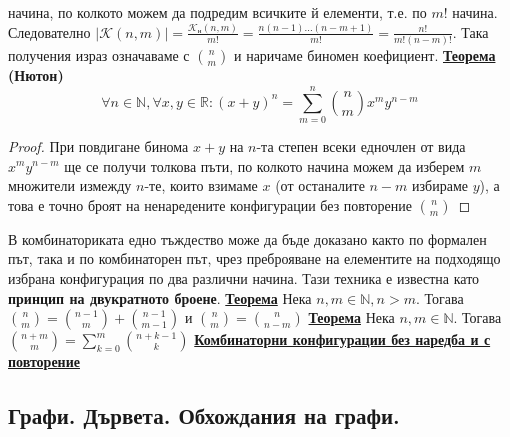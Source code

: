 \documentclass{article}
\begin{document}
начина, по колкото можем да подредим всичките й елементи, т.е. по $m!$ начина. Следователно $|\mathcal{K}(n, m)| = \frac{\mathcal{K_{\text{н}}}
(n, m)}{m!} = \frac{n(n - 1) ... (n - m + 1)}{m!} = \frac{n!}{m!(n - m)!}$. Така получения израз означаваме с $\binom{n}{m}$ и
наричаме биномен коефициент. \newline\newline
\textbf{\underline{Теорема} (Нютон)}
$$\forall n \in \mathbb{N}, \forall x, y \in \mathbb{R} : (x + y)^n = \sum_{m = 0}^{n}\binom{n}{m}x^my^{n-m}$$
\begin{proof}
При повдигане бинома $x + y$ на $n$-та степен всеки едночлен от вида $x^my^{n - m}$ ще се получи толкова пъти, по колкото начина
можем да изберем $m$ множители измежду $n$-те, които взимаме $x$ (от останалите $n - m$ избираме $y$), а това е точно броят на
ненаредените конфигурации без повторение $\binom{n}{m}$
\end{proof}
В комбинаториката едно тъждество може да бъде доказано както по формален път, така и по комбинаторен път, чрез преброяване на
елементите на подходящо избрана конфигурация по два различни начина. Тази техника е известна като \textbf{принцип на двукратното
броене}. \newline\newline
\textbf{\underline{Теорема}} \newline
Нека $n, m \in \mathbb{N}, n > m$. Тогава $\binom{n}{m} = \binom{n - 1}{m} + \binom{n - 1}{m - 1}$ и $\binom{n}{m} = \binom{n}{n - m}$ \newline\newline
\textbf{\underline{Теорема}} \newline
Нека $n, m \in \mathbb{N}$. Тогава $\binom{n + m}{m} = \sum_{k = 0}^{m}\binom{n + k - 1}{k}$ \newline\newline
\textbf{\underline{Комбинаторни конфигурации без наредба и с повторение}} \newline\newline

\subsection*{Графи. Дървета. Обхождания на графи.}
\end{document}
